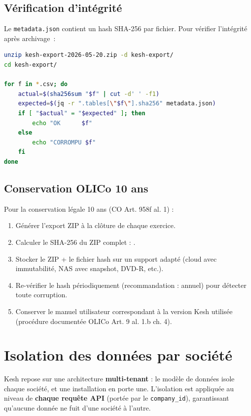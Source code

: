 \documentclass[a4paper,11pt,oneside]{article}
\begin{document}
\subsection{Vérification d'intégrité}

Le \texttt{metadata.json} contient un hash SHA-256 par fichier. Pour vérifier l'intégrité après
archivage~:

\begin{lstlisting}[language=bash]
unzip kesh-export-2026-05-20.zip -d kesh-export/
cd kesh-export/

for f in *.csv; do
    actual=$(sha256sum "$f" | cut -d' ' -f1)
    expected=$(jq -r ".tables[\"$f\"].sha256" metadata.json)
    if [ "$actual" = "$expected" ]; then
        echo "OK      $f"
    else
        echo "CORROMPU $f"
    fi
done
\end{lstlisting}

\subsection{Conservation OLICo 10 ans}

Pour la conservation légale 10 ans (CO Art. 958f al. 1) :

\begin{enumerate}
    \item Générer l'export ZIP à la clôture de chaque exercice.
    \item Calculer le SHA-256 du ZIP complet : .
    \item Stocker le ZIP + le fichier hash sur un support adapté (cloud avec immutabilité, NAS avec snapshot, DVD-R, etc.).
    \item Re-vérifier le hash périodiquement (recommandation : annuel) pour détecter toute corruption.
    \item Conserver le manuel utilisateur correspondant à la version Kesh utilisée (procédure documentée OLICo Art. 9 al. 1.b ch. 4).
\end{enumerate}

\section{Isolation des données par société}

Kesh repose sur une architecture \textbf{multi-tenant} : le modèle de données
isole chaque société, et une installation en porte une. L'isolation
est appliquée au niveau de \textbf{chaque requête API} (portée par le
\texttt{company\_id}), garantissant qu'aucune donnée ne fuit d'une société à
l'autre.
\end{document}
